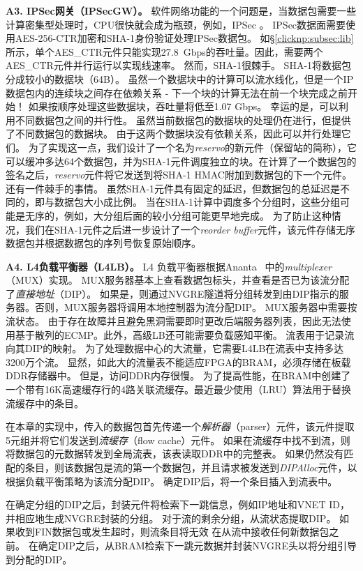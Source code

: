 \textbf{A3. IPSec网关（IPSecGW）。}
软件网络功能的一个问题是，当数据包需要一些计算密集型处理时，CPU很快就会成为瓶颈，例如，IPSec \cite {packetshader}。
IPSec数据面需要使用AES-256-CTR加密和SHA-1身份验证处理IPSec数据包。
如\S \ref {clicknp:subsec:lib}所示，单个AES\_CTR元件只能实现27.8~Gbps的吞吐量。因此，需要两个AES\_CTR元件并行运行以实现线速率。
然而，SHA-1很棘手。 SHA-1将数据包分成较小的数据块（64B）。
虽然一个数据块中的计算可以流水线化，但是一个IP数据包内的连续块之间存在依赖关系 - 下一个块的计算无法在前一个块完成之前开始！
如果按顺序处理这些数据块，吞吐量将低至1.07 Gbps。
幸运的是，可以利用不同数据包之间的并行性。
虽然当前数据包的数据块的处理仍在进行，但提供了不同数据包的数据块。
由于这两个数据块没有依赖关系，因此可以并行处理它们。
为了实现这一点，我们设计了一个名为\textit {reservo}的新元件（保留站的简称），它可以缓冲多达64个数据包，并为SHA-1元件调度独立的块。在计算了一个数据包的签名之后，\textit {reservo}元件将它发送到将SHA-1 HMAC附加到数据包的下一个元件。
还有一件棘手的事情。
虽然SHA-1元件具有固定的延迟，但数据包的总延迟是不同的，即与数据包大小成比例。
当在SHA-1计算中调度多个分组时，这些分组可能是无序的，例如，大分组后面的较小分组可能更早地完成。
为了防止这种情况，我们在SHA-1元件之后进一步设计了一个\textit {reorder buffer}元件，该元件存储无序数据包并根据数据包的序列号恢复原始顺序。

\textbf {A4. L4负载平衡器（L4LB）。}
L4 负载平衡器根据Ananta~ \cite {ananta}中的\textit {multiplexer}（MUX）实现。
MUX服务器基本上查看数据包标头，并查看是否已为该流分配了\textit {直接地址}（DIP）。
如果是，则通过NVGRE隧道将分组转发到由DIP指示的服务器。否则，MUX服务器将调用本地控制器为流分配DIP。
MUX服务器中需要按流状态。
由于存在故障并且避免黑洞需要即时更改后端服务器列表，因此无法使用基于散列的ECMP。此外，高级LB还可能需要负载感知平衡。
流表用于记录流向其DIP的映射。
为了处理数据中心的大流量，它需要L4LB在流表中支持多达3200万个流。
显然，如此大的流量表不能适应FPGA的BRAM，必须存储在板载DDR存储器中。
但是，访问DDR内存很慢。
为了提高性能，在BRAM中创建了一个带有16K高速缓存行的4路关联流缓存。最近最少使用（LRU）算法用于替换流缓存中的条目。

在本章的实现中，传入的数据包首先传递一个\textit {解析器}（parser）元件，该元件提取5元组并将它们发送到\textit {流缓存}（flow cache）元件。
如果在流缓存中找不到流，则将数据包的元数据转发到全局流表，该表读取DDR中的完整表。
如果仍然没有匹配的条目，则该数据包是流的第一个数据包，并且请求被发送到\textit {DIPAlloc}元件，以根据负载平衡策略为该流分配DIP。
确定DIP后，将一个条目插入到流表中。

在确定分组的DIP之后，封装元件将检索下一跳信息，例如IP地址和VNET ID，并相应地生成NVGRE封装的分组。
对于流的剩余分组，从流状态提取DIP。
如果收到FIN数据包或发生超时，则流条目将无效
在从流中接收任何新数据包之前。
在确定DIP之后，从BRAM检索下一跳元数据并封装NVGRE头以将分组引导到分配的DIP。

